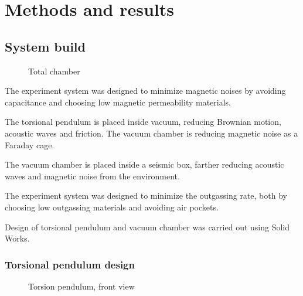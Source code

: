 \documentclass[\main/master.tex]{subfiles}
\begin{document}
\chapter{Methods and results}\label{chapter:Methods and results}

\section{System build}
\begin{figure}[htbp]
	\centering
	\caption[Total chamber]{Total chamber}
	\label{fig:Total chamber}
\end{figure}
\FloatBarrier
\par\noindent
The experiment system was designed to minimize magnetic noises by avoiding capacitance and choosing low magnetic permeability materials.
\par\noindent
The torsional pendulum is placed inside vacuum, reducing Brownian motion, acoustic waves and friction. The vacuum chamber is reducing magnetic noise as a Faraday cage.
\par\noindent
The vacuum chamber is placed inside a seismic box, farther reducing acoustic waves and magnetic noise from the environment.

\par\noindent
The experiment system was designed to minimize the outgassing rate, both by choosing low outgassing materials and avoiding air pockets. 
\par\noindent
Design of torsional pendulum and vacuum chamber was carried out using Solid Works.

\subsection{Torsional pendulum design}
\begin{figure}[htbp]
	\centering
	\caption[Torsion pendulum, front view]{Torsion pendulum, front view}
	\label{fig:pendulum front}
\end{figure}
\FloatBarrier
\end{document}
